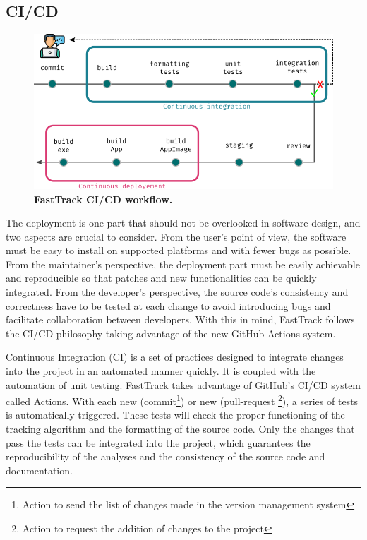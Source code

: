 		\subsection{CI/CD}

        \begin{figure}[h!]
        \centering
        \includegraphics[width=1\textwidth]{part_1/assets/Figure_cicd.png}
        \caption{\textbf{FastTrack CI/CD workflow.}}
        \label{part_1:fig_cicd}
        \end{figure}

        The deployment is one part that should not be overlooked in software design, and two aspects are crucial to consider. From the user's point of view, the software must be easy to install on supported platforms and with fewer bugs as possible. From the maintainer's perspective, the deployment part must be easily achievable and reproducible so that patches and new functionalities can be quickly integrated. From the developer's perspective, the source code's consistency and correctness have to be tested at each change to avoid introducing bugs and facilitate collaboration between developers.  With this in mind, FastTrack follows the CI/CD philosophy \cite{shahin2017continuous}\cite{wikstrom2019benefits} taking advantage of the new GitHub Actions system.

        Continuous Integration (CI) is a set of practices designed to integrate changes into the project in an automated manner quickly. It is coupled with the automation of unit testing. FastTrack takes advantage of GitHub's CI/CD system called Actions. With each new (commit\footnote{Action to send the list of changes made in the version management system}) or new (pull-request \footnote{Action to request the addition of changes to the project}), a series of tests is automatically triggered. These tests will check the proper functioning of the tracking algorithm and the formatting of the source code. Only the changes that pass the tests can be integrated into the project, which guarantees the reproducibility of the analyses and the consistency of the source code and documentation.

